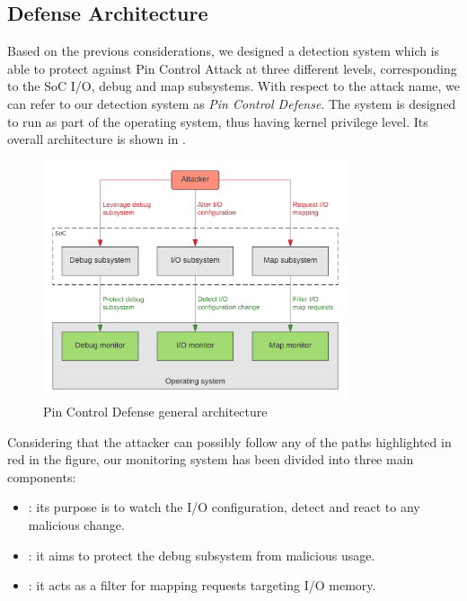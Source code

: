 \subsection{Defense Architecture}
\label{sec:def-arch}

Based on the previous considerations, we designed a detection system which is able to protect against Pin Control Attack at three different levels,
corresponding to the SoC I/O, debug and map subsystems. With respect to the attack name, we can refer to our detection system as \emph{Pin Control Defense}.
The system is designed to run as part of the operating system, thus having kernel privilege level.
Its overall architecture is shown in .
\begin{figure}[h]
\centerline{\includegraphics[width=0.8\textwidth]{res/defense}}
\caption{Pin Control Defense general architecture \label{fig:defense}}
\end{figure}
Considering that the attacker can possibly follow any of the paths highlighted in red in the figure,
our monitoring system has been divided into three main components:
\begin{itemize}
	\item {}: its purpose is to watch the I/O configuration, detect and react to any malicious change.
	\item {}: it aims to protect the debug subsystem from malicious usage.
	\item {}: it acts as a filter for mapping requests targeting I/O memory.
\end{itemize}

